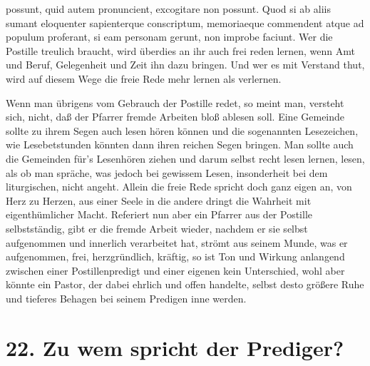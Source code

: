 possunt, quid autem pronuncient, excogitare non possunt. Quod si ab aliis sumant eloquenter sapienterque conscriptum, memoriaeque commendent atque ad populum proferant, si eam personam gerunt, non improbe faciunt. Wer die Postille treulich braucht, wird überdies an ihr auch frei reden lernen, wenn Amt und Beruf, Gelegenheit und Zeit ihn dazu bringen. Und wer es mit Verstand thut, wird auf diesem Wege die freie Rede mehr lernen als verlernen.

Wenn man übrigens vom Gebrauch der Postille redet, so meint man, versteht sich, nicht, daß der Pfarrer fremde Arbeiten bloß ablesen soll. Eine Gemeinde sollte zu ihrem Segen auch lesen hören können und die sogenannten Lesezeichen, wie Lesebetstunden könnten dann ihren reichen Segen bringen. Man sollte auch die Gemeinden für’s Lesenhören ziehen und darum selbst recht lesen lernen, lesen, als ob man spräche, was jedoch bei gewissem Lesen, insonderheit bei dem liturgischen, nicht angeht. Allein die freie Rede spricht doch ganz eigen an, von Herz zu Herzen, aus einer Seele in die andere dringt die Wahrheit mit eigenthümlicher Macht. Referiert nun aber ein Pfarrer aus der Postille selbstständig, gibt er die fremde Arbeit wieder, nachdem er sie selbst aufgenommen und innerlich verarbeitet hat, strömt aus seinem Munde, was er aufgenommen, frei, herzgründlich, kräftig, so ist Ton und Wirkung anlangend zwischen einer Postillenpredigt und einer eigenen kein Unterschied, wohl aber könnte ein Pastor, der dabei ehrlich und offen handelte, selbst desto größere Ruhe und tieferes Behagen bei seinem Predigen inne werden.

\section{22. Zu wem spricht der Prediger?}

